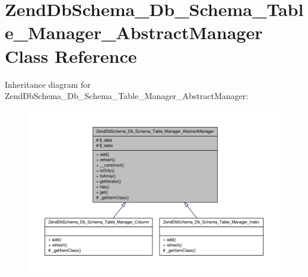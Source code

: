 \hypertarget{classZendDbSchema__Db__Schema__Table__Manager__AbstractManager}{\section{\-Zend\-Db\-Schema\-\_\-\-Db\-\_\-\-Schema\-\_\-\-Table\-\_\-\-Manager\-\_\-\-Abstract\-Manager \-Class \-Reference}
\label{classZendDbSchema__Db__Schema__Table__Manager__AbstractManager}
}


\-Inheritance diagram for \-Zend\-Db\-Schema\-\_\-\-Db\-\_\-\-Schema\-\_\-\-Table\-\_\-\-Manager\-\_\-\-Abstract\-Manager\-:\nopagebreak
\begin{figure}[H]
\begin{center}
\leavevmode
\includegraphics[width=350pt]{classZendDbSchema__Db__Schema__Table__Manager__AbstractManager__inherit__graph}
\end{center}
\end{figure}
